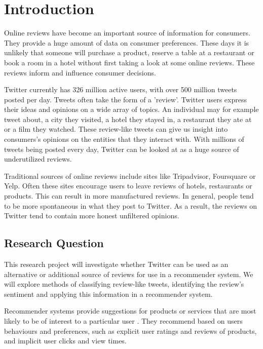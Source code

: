 \chapter{Introduction}
\begin{justify}
Online reviews have become an important source of information for consumers. They provide a huge amount of data on consumer preferences. These days it is unlikely that someone will purchase a product, reserve a table at a restaurant or book a room in a hotel without first taking a look at some online reviews. These reviews inform and influence consumer decisions.
\end{justify}

Twitter currently has 326 million active users, with over 500 million tweets posted per day. Tweets often take the form of a 'review'. Twitter users express their ideas and opinions on a wide array of topics. An individual may for example tweet about, a city they visited, a hotel they stayed in, a restaurant they ate at or a film they watched. These review-like tweets can give us insight into consumers’s opinions on the entities that they interact with. With millions of tweets being posted every day, Twitter can be looked at as a huge source of underutilized reviews.

Traditional sources of online reviews include sites like Tripadvisor, Foursquare or Yelp. Often these sites encourage users to leave reviews of hotels, restaurants or products. This can result in more manufactured reviews. In general, people tend to be more spontaneous in what they post to Twitter. As a result, the reviews on Twitter tend to contain more honest unfiltered opinions. 

\section{Research Question}
This research project will investigate whether Twitter can be used as an alternative or additional source of reviews for use in a recommender system. We will explore methods of classifying review-like tweets, identifying the review's sentiment and applying this information in a recommender system.

Recommender systems provide suggestions for products or services that are most likely to be of interest to a particular user \cite{Ricci2015}. They recommend based on users behaviours and preferences, such as explicit user ratings and reviews of products, and implicit user clicks and view times.

